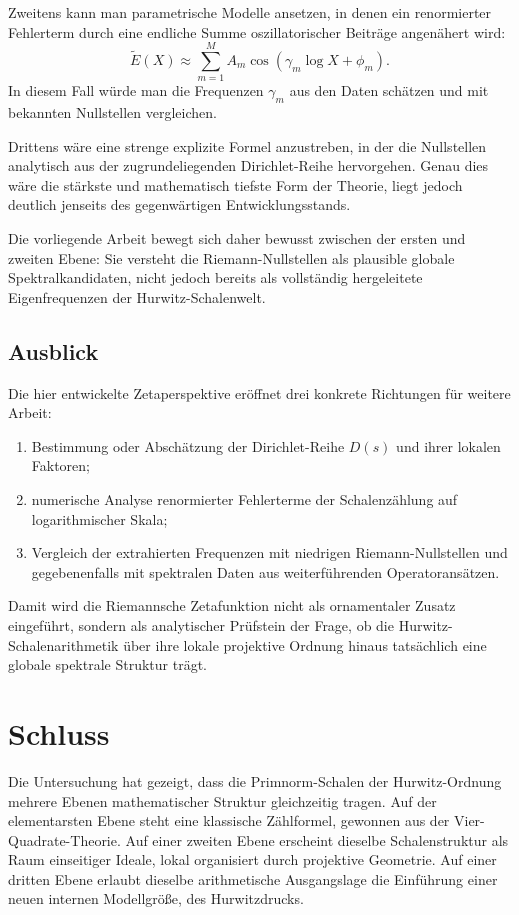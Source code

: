 \documentclass[a4paper,12pt]{article}
\theoremstyle{definition}
\numberwithin{equation}{section}
\begin{document}
	Zweitens kann man parametrische Modelle ansetzen, in denen ein renormierter Fehlerterm durch eine endliche Summe oszillatorischer Beiträge angenähert wird:
	\[
	\widetilde E(X) \approx \sum_{m=1}^M A_m \cos(\gamma_m \log X + \phi_m).
	\]
	In diesem Fall würde man die Frequenzen $\gamma_m$ aus den Daten schätzen und mit bekannten Nullstellen vergleichen.
	
	Drittens wäre eine strenge explizite Formel anzustreben, in der die Nullstellen analytisch aus der zugrundeliegenden Dirichlet-Reihe hervorgehen. Genau dies wäre die stärkste und mathematisch tiefste Form der Theorie, liegt jedoch deutlich jenseits des gegenwärtigen Entwicklungsstands.
	
	Die vorliegende Arbeit bewegt sich daher bewusst zwischen der ersten und zweiten Ebene: Sie versteht die Riemann-Nullstellen als plausible globale Spektralkandidaten, nicht jedoch bereits als vollständig hergeleitete Eigenfrequenzen der Hurwitz-Schalenwelt.
	
	\subsection{Ausblick}
	
	Die hier entwickelte Zetaperspektive eröffnet drei konkrete Richtungen für weitere Arbeit:
	
	\begin{enumerate}
		\item Bestimmung oder Abschätzung der Dirichlet-Reihe $D(s)$ und ihrer lokalen Faktoren;
		\item numerische Analyse renormierter Fehlerterme der Schalenzählung auf logarithmischer Skala;
		\item Vergleich der extrahierten Frequenzen mit niedrigen Riemann-Nullstellen und gegebenenfalls mit spektralen Daten aus weiterführenden Operatoransätzen.
	\end{enumerate}
	
	Damit wird die Riemannsche Zetafunktion nicht als ornamentaler Zusatz eingeführt, sondern als analytischer Prüfstein der Frage, ob die Hurwitz-Schalenarithmetik über ihre lokale projektive Ordnung hinaus tatsächlich eine globale spektrale Struktur trägt.
	\section{Schluss}
	
	Die Untersuchung hat gezeigt, dass die Primnorm-Schalen der Hurwitz-Ordnung mehrere Ebenen mathematischer Struktur gleichzeitig tragen. Auf der elementarsten Ebene steht eine klassische Zählformel, gewonnen aus der Vier-Quadrate-Theorie. Auf einer zweiten Ebene erscheint dieselbe Schalenstruktur als Raum einseitiger Ideale, lokal organisiert durch projektive Geometrie. Auf einer dritten Ebene erlaubt dieselbe arithmetische Ausgangslage die Einführung einer neuen internen Modellgröße, des Hurwitzdrucks.
	
\end{document}
